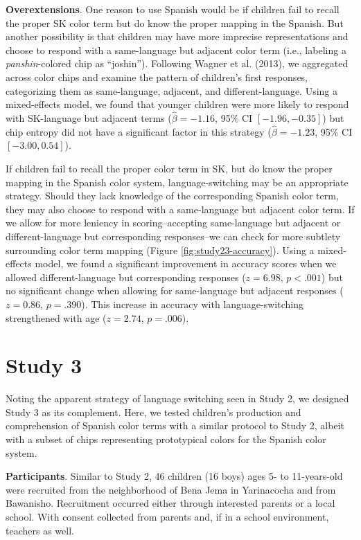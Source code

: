 \documentclass[
  english,
  ,man,floatsintext]{apa6}
\begin{document}
\textbf{Overextensions}. One reason to use Spanish would be if children fail to recall the proper SK color term but do know the proper mapping in the Spanish. But another possibility is that children may have more imprecise representations and choose to respond with a same-language but adjacent color term (i.e., labeling a \emph{panshin}-colored chip as \enquote{joshin}). Following Wagner et al. (2013), we aggregated across color chips and examine the pattern of children's first responses, categorizing them as same-language, adjacent, and different-language. Using a mixed-effects model, we found that younger children were more likely to respond with SK-language but adjacent terms (\(\hat{\beta} = -1.16\), 95\% CI \([-1.96, -0.35]\)) but chip entropy did not have a significant factor in this strategy (\(\hat{\beta} = -1.23\), 95\% CI \([-3.00, 0.54]\)).

If children fail to recall the proper color term in SK, but do know the proper mapping in the Spanish color system, language-switching may be an appropriate strategy. Should they lack knowledge of the corresponding Spanish color term, they may also choose to respond with a same-language but adjacent color term. If we allow for more leniency in scoring--accepting same-language but adjacent or different-language but corresponding responses--we can check for more subtlety surrounding color term mapping (Figure \ref{fig:study23-accuracy}). Using a mixed-effects model, we found a significant improvement in accuracy scores when we allowed different-language but corresponding responses (\(z = 6.98\), \(p < .001\)) but no significant change when allowing for same-language but adjacent responses (\(z = 0.86\), \(p = .390\)). This increase in accuracy with language-switching strengthened with age (\(z = 2.74\), \(p = .006\)).

\hypertarget{study-3}{%
\section{Study 3}\label{study-3}}

Noting the apparent strategy of language switching seen in Study 2, we designed Study 3 as its complement. Here, we tested children's production and comprehension of Spanish color terms with a similar protocol to Study 2, albeit with a subset of chips representing prototypical colors for the Spanish color system.

\textbf{Participants}. Similar to Study 2, 46 children (16 boys) ages 5- to 11-years-old were recruited from the neighborhood of Bena Jema in Yarinacocha and from Bawanisho. Recruitment occurred either through interested parents or a local school. With consent collected from parents and, if in a school environment, teachers as well.
\end{document}
